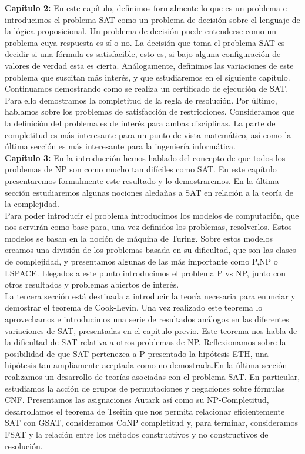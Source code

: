 \textbf{Capítulo 2:} En este capítulo, definimos formalmente lo que es un problema e introducimos el problema SAT como un problema de decisión sobre el lenguaje de la lógica proposicional. Un  problema de decisión puede entenderse como un problema cuya respuesta es sí o no. La decisión que toma el problema SAT es decidir si una fórmula es satisfacible, esto es, si bajo alguna configuración de valores de verdad esta es cierta. Análogamente, definimos las variaciones de este problema que suscitan más interés, y que estudiaremos en el siguiente capítulo. Continuamos demostrando como se realiza un certificado de ejecución de SAT. Para ello demostramos la completitud de la regla de resolución. Por último, hablamos sobre los problemas de satisfacción de restricciones. Consideramos que la definición del problema es de interés para ambas disciplinas. La parte de completitud es más interesante para un punto de vista matemático, así como la última sección es más interesante para la ingeniería informática.\\

\textbf{Capítulo 3:} En la introducción hemos hablado del concepto de que todos los problemas de NP son como mucho tan difíciles como SAT. En este capítulo presentaremos formalmente este resultado y lo demostraremos. En la última sección estudiaremos algunas nociones aledañas a SAT en relación a la teoría de la complejidad.\\

Para poder introducir el problema introducimos los modelos de computación, que nos servirán como base para, una vez definidos los problemas, resolverlos. Estos modelos se basan en la noción de máquina de Turing. Sobre estos modelos creamos una división de los problemas basada en su dificultad, que son las clases de complejidad, y presentamos algunas de las más importante como P,NP o LSPACE. Llegados a este punto introducimos el problema P vs NP, junto con otros resultados y problemas abiertos de interés.\\


La tercera sección está destinada a introducir la teoría necesaria para enunciar y demostrar el teorema de Cook-Levin. Una vez realizado este teorema lo aprovechamos e  introducimos una serie de resultados análogos en las diferentes variaciones de SAT, presentadas en el capítulo previo. Este teorema nos habla de la dificultad de SAT relativa a otros problemas de NP. Reflexionamos sobre la posibilidad de que SAT pertenezca a P presentado la hipótesis ETH, una hipótesis tan ampliamente aceptada como no demostrada.En la última sección realizamos un desarrollo de teorías asociadas con el problema SAT. En particular, estudiamos la acción de grupos de permutaciones y negaciones sobre fórmulas CNF. Presentamos las asignaciones Autark así como su NP-Completitud, desarrollamos el teorema de Tseitin que nos permita relacionar eficientemente SAT con GSAT, consideramos CoNP completitud y, para terminar, consideramos FSAT y la relación entre los métodos constructivos y no constructivos de resolución.\\

